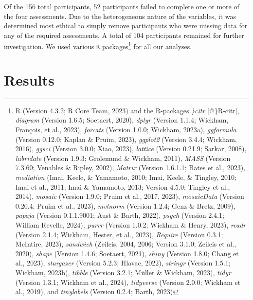 \documentclass[
  man,floatsintext]{apa7}
\begin{document}
Of the 156 total participants, 52 participants failed to complete one or more of the four assessments. Due to the heterogeneous nature of the variables, it was determined most ethical to simply remove participants who were missing data for any of the required assessments. A total of 104 participants remained for further investigation. We used various \texttt{R} packages\footnote{R (Version 4.3.2; R Core Team, 2023) and the R-packages \emph{\}citr} {[}@\}R-citr{]}, \emph{diagram} (Version 1.6.5; Soetaert, 2020), \emph{dplyr} (Version 1.1.4; Wickham, François, et al., 2023), \emph{forcats} (Version 1.0.0; Wickham, 2023a), \emph{ggformula} (Version 0.12.0; Kaplan \& Pruim, 2023), \emph{ggplot2} (Version 3.4.4; Wickham, 2016), \emph{ggsci} (Version 3.0.0; Xiao, 2023), \emph{lattice} (Version 0.21.9; Sarkar, 2008), \emph{lubridate} (Version 1.9.3; Grolemund \& Wickham, 2011), \emph{MASS} (Version 7.3.60; Venables \& Ripley, 2002), \emph{Matrix} (Version 1.6.1.1; Bates et al., 2023), \emph{mediation} (Imai, Keele, \& Yamamoto, 2010; Imai, Keele, \& Tingley, 2010; Imai et al., 2011; Imai \& Yamamoto, 2013; Version 4.5.0; Tingley et al., 2014), \emph{mosaic} (Version 1.9.0; Pruim et al., 2017, 2023), \emph{mosaicData} (Version 0.20.4; Pruim et al., 2023), \emph{mvtnorm} (Version 1.2.4; Genz \& Bretz, 2009), \emph{papaja} (Version 0.1.1.9001; Aust \& Barth, 2022), \emph{psych} (Version 2.4.1; William Revelle, 2024), \emph{purrr} (Version 1.0.2; Wickham \& Henry, 2023), \emph{readr} (Version 2.1.4; Wickham, Hester, et al., 2023), \emph{Require} (Version 0.3.1; McIntire, 2023), \emph{sandwich} (Zeileis, 2004, 2006; Version 3.1.0; Zeileis et al., 2020), \emph{shape} (Version 1.4.6; Soetaert, 2021), \emph{shiny} (Version 1.8.0; Chang et al., 2023), \emph{stargazer} (Version 5.2.3; Hlavac, 2022), \emph{stringr} (Version 1.5.1; Wickham, 2023b), \emph{tibble} (Version 3.2.1; Müller \& Wickham, 2023), \emph{tidyr} (Version 1.3.1; Wickham et al., 2024), \emph{tidyverse} (Version 2.0.0; Wickham et al., 2019), and \emph{tinylabels} (Version 0.2.4; Barth, 2023)} for all our analyses.

\hypertarget{results}{%
\section{Results}\label{results}}
\end{document}
